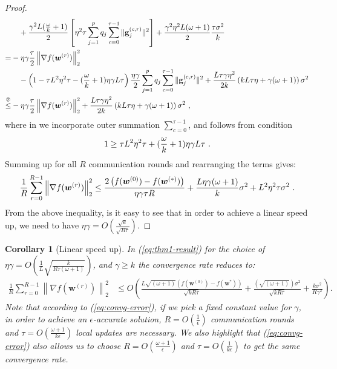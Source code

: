 \documentclass{article} %
\newtheorem{corollary}{Corollary}
\begin{document}
\begin{proof}
\begin{align}
     &\quad+\frac{\gamma^2 L(\frac{\omega}{k}+1)}{2}\left[{\eta^2\tau}\sum_{j=1}^pq_j\sum_{c=0}^{\tau-1}\|\mathbf{g}^{(c,r)}_{j}\|^2\right]+\frac{\gamma^2\eta^2 L(\omega+1)}{2}\frac{\tau \sigma^2}{k}\nonumber\\
     =&-\eta\gamma\frac{\tau}{2}\left\|\nabla f({\boldsymbol{w}}^{(r)})\right\|_2^2\nonumber\\
     &\quad-\left(1-{\tau L^2\eta^2\tau}-{(\frac{\omega}{k}+1)\eta\gamma L}{\tau}\right)\frac{\eta\gamma}{2}\sum_{j=1}^pq_j\sum_{c=0}^{\tau-1}\|\mathbf{g}^{(c,r)}_{j}\|^2+\frac{L\tau\gamma\eta^2 }{2k}\left(kL\tau\eta+\gamma(\omega+1)\right)\sigma^2\nonumber\\
     \stackrel{\text{\ding{193}}}{\leq}& -\eta\gamma\frac{\tau}{2}\left\|\nabla f({\boldsymbol{w}}^{(r)})\right\|_2^2+\frac{L\tau\gamma\eta^2 }{2k}\left(kL\tau\eta+\gamma(\omega+1)\right)\sigma^2 \ ,  \label{eq:finalll}
\end{align}
where in  we incorporate outer summation $\sum_{c=0}^{\tau-1}$, and   follows from condition 
\begin{align}\notag
   1\geq {\tau L^2\eta^2\tau}+(\frac{\omega}{k}+1)\eta\gamma L{\tau} \ . 
\end{align}
Summing up for all $R$ communication rounds and  rearranging the terms gives:
\begin{align}\notag
    \frac{1}{R}\sum_{r=0}^{R-1}\left\|\nabla f({\boldsymbol{w}}^{(r)})\right\|_2^2\leq \frac{2\left(f(\boldsymbol{w}^{(0)})-f(\boldsymbol{w}^{(*)})\right)}{\eta\gamma\tau R}+\frac{L\eta\gamma{(\omega+1)}}{k}\sigma^2+{L^2\eta^2\tau }\sigma^2 \ . 
\end{align}
From the above inequality, is it easy to see that in order to achieve a linear speed up, we need to have $\eta\gamma=O\left(\frac{\sqrt{k}}{\sqrt{R \tau}}\right)$.
\end{proof}


\begin{corollary}[Linear speed up] 
In (\ref{eq:thm1-result}) for the choice of  $\eta\gamma=O\left(\frac{1}{L}\sqrt{\frac{k}{R\tau\left(\omega+1\right)}}\right)$, and $\gamma\geq k$  the  convergence rate reduces to:
\begin{align}
    \frac{1}{R}\sum_{r=0}^{R-1}\left\|\nabla f({\boldsymbol{w}}^{(r)})\right\|_2^2&\leq O\left(\frac{L\sqrt{\left(\omega+1\right)}\left(f(\boldsymbol{w}^{(0)})-f(\boldsymbol{w}^{*})\right)}{\sqrt{kR\tau}}+\frac{\left(\sqrt{\left(\omega+1\right)}\right)\sigma^2}{\sqrt{kR\tau}}+\frac{k\sigma^2}{R\gamma^2}\right).\label{eq:convg-error}
\end{align}
Note that according to (\ref{eq:convg-error}), if we pick  a fixed constant value for  $\gamma$, in order to achieve an $\epsilon$-accurate solution, $R=O\left(\frac{1}{\epsilon}\right)$ communication rounds and $\tau=O\left(\frac{\omega+1}{k\epsilon}\right)$ local updates are necessary. We also highlight  that (\ref{eq:convg-error}) also allows us to choose $R=O\left(\frac{\omega+1}{\epsilon}\right)$ and $\tau=O\left(\frac{1}{k\epsilon}\right)$ to get the  same convergence rate.
\end{corollary}
\end{document}
